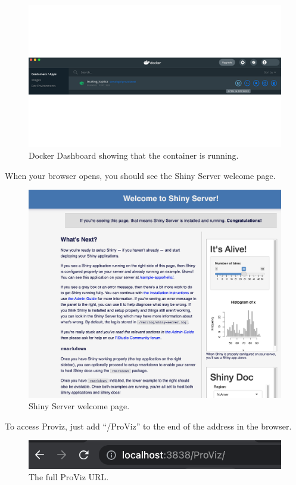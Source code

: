 \documentclass[
]{book}
\begin{document}
\begin{figure}
\centering
\includegraphics{images/Dashboard_runningimage.png}
\caption{Docker Dashboard showing that the container is running.}
\end{figure}

When your browser opens, you should see the Shiny Server welcome page.

\begin{figure}
\centering
\includegraphics{images/ShinyWelcome.png}
\caption{Shiny Server welcome page.}
\end{figure}

To access Proviz, just add ``/ProViz'' to the end of the address in the browser.

\begin{figure}
\centering
\includegraphics{images/ProVizURL.png}
\caption{The full ProViz URL.}
\end{figure}
\end{document}
